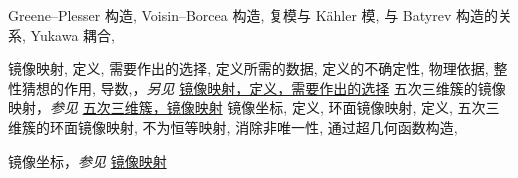 \begin{theindex}
\subitem \leavevmode\hypertarget{idx:0803}{Greene--Plesser 构造},\enspace{}
\subitem \leavevmode\hypertarget{idx:0804}{Voisin--Borcea 构造},\enspace{}
\subsubitem \leavevmode\hypertarget{idx:0805}{复模与 Kähler 模},\enspace{}
\subsubitem \leavevmode\hypertarget{idx:0806}{与 Batyrev 构造的关系},\enspace{}
\subsubitem \leavevmode\hypertarget{idx:0807}{Yukawa 耦合},\enspace{}
\indexspace
\item \leavevmode\hypertarget{idx:0809}{镜像映射},\enspace{}
\subitem \leavevmode\hypertarget{idx:0810}{定义},\enspace{}
\subsubitem \leavevmode\hypertarget{idx:0811}{需要作出的选择},\enspace{}
\subsubitem \leavevmode\hypertarget{idx:0812}{定义所需的数据},\enspace{}
\subsubitem \leavevmode\hypertarget{idx:0813}{定义的不确定性},\enspace{}
\subsubitem \leavevmode\hypertarget{idx:0814}{物理依据},\enspace{}
\subsubitem \leavevmode\hypertarget{idx:0815}{整性猜想的作用},\enspace{}
\subitem \leavevmode\hypertarget{idx:0816}{导数},\enspace{}，\textit{另见} \hyperlink{idx:0811}{镜像映射，定义，需要作出的选择}
\subitem \leavevmode\hypertarget{idx:0817}{五次三维簇的镜像映射}，\textit{参见} \hyperlink{idx:1195}{五次三维簇，镜像映射}
\subitem \leavevmode\hypertarget{idx:0818}{镜像坐标},\enspace{}
\subsubitem \leavevmode\hypertarget{idx:0819}{定义},\enspace{}
\subitem \leavevmode\hypertarget{idx:0820}{环面镜像映射},\enspace{}
\subsubitem \leavevmode\hypertarget{idx:0821}{定义},\enspace{}
\subsubitem \leavevmode\hypertarget{idx:0822}{五次三维簇的环面镜像映射},\enspace{}
\subsubitem \leavevmode\hypertarget{idx:0823}{不为恒等映射},\enspace{}
\subsubitem \leavevmode\hypertarget{idx:0824}{消除非唯一性},\enspace{}
\subitem \leavevmode\hypertarget{idx:0825}{通过超几何函数构造},\enspace{}
\indexspace
\item \leavevmode\hypertarget{idx:0808}{镜像坐标}，\textit{参见} \hyperlink{idx:0809}{镜像映射}

\end{theindex}
